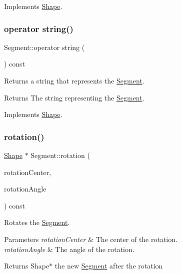 Implements \hyperlink{class_shape_a91f18af3004ba210db5c91084c50beb9}{Shape}.

\hypertarget{class_segment_a28b3be893a35a0d73574354752c147fd}{}\label{class_segment_a28b3be893a35a0d73574354752c147fd} 
\subsubsection{\texorpdfstring{operator string()}{operator string()}}
{\footnotesize\ttfamily Segment\+::operator string (\begin{DoxyParamCaption}{ }\end{DoxyParamCaption}) const\hspace{0.3cm}{\ttfamily [virtual]}}

Returns a string that represents the \hyperlink{class_segment}{Segment}. \begin{DoxyReturn}{Returns}
The string representing the \hyperlink{class_segment}{Segment}. 
\end{DoxyReturn}


Implements \hyperlink{class_shape_a0d74dcb2db0791b88b92f439bf4a6972}{Shape}.

\hypertarget{class_segment_a46c1007c530f9be37ee7637e4ffdbf57}{}\label{class_segment_a46c1007c530f9be37ee7637e4ffdbf57} 
\subsubsection{\texorpdfstring{rotation()}{rotation()}}
{\footnotesize\ttfamily \hyperlink{class_shape}{Shape} $\ast$ Segment\+::rotation (\begin{DoxyParamCaption}\item[{const \hyperlink{class_vector2_d}{Vector2D} \&}]{rotation\+Center,  }\item[{const \hyperlink{class_radian_angle}{Radian\+Angle} \&}]{rotation\+Angle }\end{DoxyParamCaption}) const\hspace{0.3cm}{\ttfamily [virtual]}}

Rotates the \hyperlink{class_segment}{Segment}. 
\begin{DoxyParams}{Parameters}
{\em rotation\+Center} & The center of the rotation. \\
\hline
{\em rotation\+Angle} & The angle of the rotation. \\
\hline
\end{DoxyParams}
\begin{DoxyReturn}{Returns}
Shape$\ast$ the new \hyperlink{class_segment}{Segment} after the rotation 
\end{DoxyReturn}


